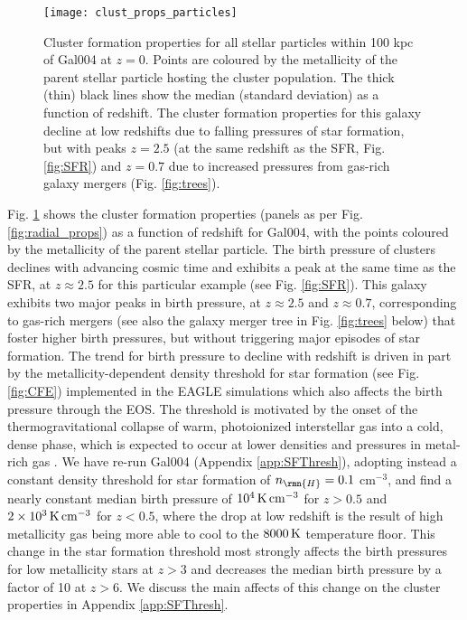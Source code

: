 \documentclass[fleqn,usenatbib]{mnras}
\newcommand{\K}              {\,{\rm K}}
\newcommand{\cmcubed}              {\,{\rm cm}^{-3}}
\begin{document}
\begin{figure*}
  \texttt{[image: clust\_props\_particles]}
  \caption{Cluster formation properties for all stellar particles within 100 kpc of Gal004 at $z=0$. Points are coloured by the metallicity of the parent stellar particle hosting the cluster population. The thick (thin) black lines show the median (standard deviation) as a function of redshift. The cluster formation properties for this galaxy decline at low redshifts due to falling pressures of star formation, but with peaks $z=2.5$ (at the same redshift as the SFR, Fig. \ref{fig:SFR}) and $z=0.7$ due to increased pressures from gas-rich galaxy mergers (Fig. \ref{fig:trees}).}
  \label{fig:particles}
\end{figure*}

Fig. \ref{fig:particles} shows the cluster formation properties (panels as per Fig. \ref{fig:radial_props}) as a function of redshift for Gal004, with the points coloured by the metallicity of the parent stellar particle. 
The birth pressure of clusters declines with advancing cosmic time and exhibits a peak at the same time as the SFR, at $z \approx 2.5$ for this particular example (see Fig. \ref{fig:SFR}). This galaxy exhibits two major peaks in birth pressure, at $z\approx2.5$ and $z\approx0.7$, corresponding to gas-rich mergers (see also the galaxy merger tree in Fig. \ref{fig:trees} below) that foster higher birth pressures, but without triggering major episodes of star formation. 
The trend for birth pressure to decline with redshift is driven in part by the metallicity-dependent density threshold for star formation (see Fig. \ref{fig:CFE}) implemented in the EAGLE simulations which also affects the birth pressure through the EOS. The threshold is motivated by the onset of the thermogravitational collapse of warm, photoionized interstellar gas into a cold, dense phase, which is expected to occur at lower densities and pressures in metal-rich gas \citep{Schaye_04}. 
We have re-run Gal004 (Appendix \ref{app:SFThresh}), adopting instead a constant density threshold for star formation of $n_\rmn{H} = 0.1$ cm$^{-3}$, and find a nearly constant median birth pressure of $10^4 \K \cmcubed$ for $z>0.5$ and $2\times10^3 \K \cmcubed$ for $z<0.5$, where the drop at low redshift is the result of high metallicity gas being more able to cool to the $8000\K$ temperature floor. This change in the star formation threshold most strongly affects the birth pressures for low metallicity stars at $z>3$ and decreases the median birth pressure by a factor of 10 at $z>6$. We discuss the main affects of this change on the cluster properties in Appendix \ref{app:SFThresh}.
\end{document}
